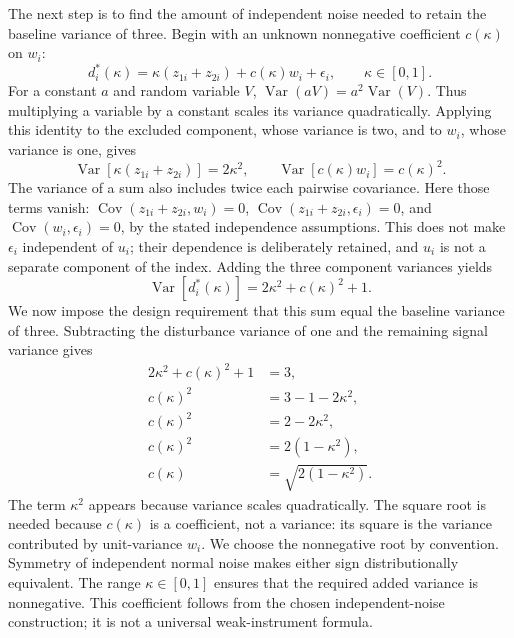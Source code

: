 The next step is to find the amount of independent noise needed to retain the baseline variance of three. Begin with an unknown nonnegative coefficient $c(\kappa)$ on $w_i$:
\begin{equation}
 d_i^*(\kappa)=\kappa(z_{1i}+z_{2i})+c(\kappa)w_i+\epsilon_i,
 \qquad \kappa\in[0,1].
 \label{eq:appendix-kappa-unknown}
\end{equation}
For a constant $a$ and random variable $V$, $\operatorname{Var}(aV)=a^2\operatorname{Var}(V)$. Thus multiplying a variable by a constant scales its variance quadratically. Applying this identity to the excluded component, whose variance is two, and to $w_i$, whose variance is one, gives
\[
 \operatorname{Var}\!\left[\kappa(z_{1i}+z_{2i})\right]=2\kappa^2,
 \qquad \operatorname{Var}\!\left[c(\kappa)w_i\right]=c(\kappa)^2.
\]
The variance of a sum also includes twice each pairwise covariance. Here those terms vanish: $\operatorname{Cov}(z_{1i}+z_{2i},w_i)=0$, $\operatorname{Cov}(z_{1i}+z_{2i},\epsilon_i)=0$, and $\operatorname{Cov}(w_i,\epsilon_i)=0$, by the stated independence assumptions. This does not make $\epsilon_i$ independent of $u_i$; their dependence is deliberately retained, and $u_i$ is not a separate component of the index. Adding the three component variances yields
\[
 \operatorname{Var}\!\left[d_i^*(\kappa)\right]
 =2\kappa^2+c(\kappa)^2+1.
\]
We now impose the design requirement that this sum equal the baseline variance of three. Subtracting the disturbance variance of one and the remaining signal variance gives
\begin{equation}
 \begin{aligned}
  2\kappa^2+c(\kappa)^2+1&=3,\\
  c(\kappa)^2&=3-1-2\kappa^2,\\
  c(\kappa)^2&=2-2\kappa^2,\\
  c(\kappa)^2&=2(1-\kappa^2),\\
  c(\kappa)&=\sqrt{2(1-\kappa^2)}.
 \end{aligned}
 \label{eq:appendix-kappa-coefficient}
\end{equation}
The term $\kappa^2$ appears because variance scales quadratically. The square root is needed because $c(\kappa)$ is a coefficient, not a variance: its square is the variance contributed by unit-variance $w_i$. We choose the nonnegative root by convention. Symmetry of independent normal noise makes either sign distributionally equivalent. The range $\kappa\in[0,1]$ ensures that the required added variance is nonnegative. This coefficient follows from the chosen independent-noise construction; it is not a universal weak-instrument formula.

